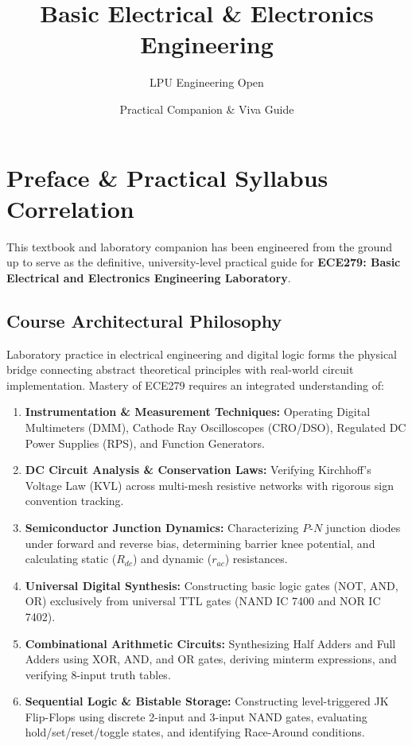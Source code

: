 \documentclass[a4paper,11pt,oneside,openany]{book}
\title{Basic Electrical \& Electronics Engineering}
\author{LPU Engineering Open}
\date{Practical Companion \& Viva Guide}
\begin{document}
\frontmatter

\makebookcover
\copyrightpage
\disclaimerpage
\chapter*{Preface \& Practical Syllabus Correlation}

\noindent This textbook and laboratory companion has been engineered from the ground up to serve as the definitive, university-level practical guide for \textbf{ECE279: Basic Electrical and Electronics Engineering Laboratory}. 

\section*{Course Architectural Philosophy}
Laboratory practice in electrical engineering and digital logic forms the physical bridge connecting abstract theoretical principles with real-world circuit implementation. Mastery of ECE279 requires an integrated understanding of:
\begin{enumerate}
    \item \textbf{Instrumentation \& Measurement Techniques:} Operating Digital Multimeters (DMM), Cathode Ray Oscilloscopes (CRO/DSO), Regulated DC Power Supplies (RPS), and Function Generators.
    \item \textbf{DC Circuit Analysis \& Conservation Laws:} Verifying Kirchhoff's Voltage Law (KVL) across multi-mesh resistive networks with rigorous sign convention tracking.
    \item \textbf{Semiconductor Junction Dynamics:} Characterizing $P$-$N$ junction diodes under forward and reverse bias, determining barrier knee potential, and calculating static ($R_{dc}$) and dynamic ($r_{ac}$) resistances.
    \item \textbf{Universal Digital Synthesis:} Constructing basic logic gates (NOT, AND, OR) exclusively from universal TTL gates (NAND IC 7400 and NOR IC 7402).
    \item \textbf{Combinational Arithmetic Circuits:} Synthesizing Half Adders and Full Adders using XOR, AND, and OR gates, deriving minterm expressions, and verifying 8-input truth tables.
    \item \textbf{Sequential Logic \& Bistable Storage:} Constructing level-triggered JK Flip-Flops using discrete 2-input and 3-input NAND gates, evaluating hold/set/reset/toggle states, and identifying Race-Around conditions.
\end{enumerate}
\end{document}
